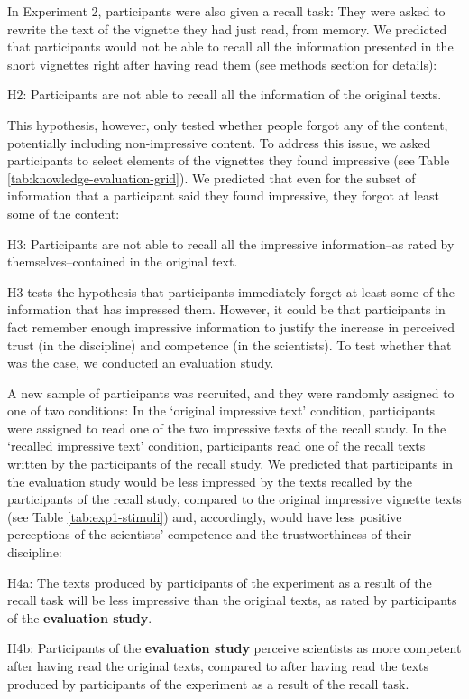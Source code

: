 \documentclass[
  english,
  doc,floatsintext]{apa6}
\begin{document}
In Experiment 2, participants were also given a recall task: They were asked to rewrite the text of the vignette they had just read, from memory. We predicted that participants would not be able to recall all the information presented in the short vignettes right after having read them (see methods section for details):

H2: Participants are not able to recall all the information of the original texts.

This hypothesis, however, only tested whether people forgot any of the content, potentially including non-impressive content. To address this issue, we asked participants to select elements of the vignettes they found impressive (see Table \ref{tab:knowledge-evaluation-grid}). We predicted that even for the subset of information that a participant said they found impressive, they forgot at least some of the content:

H3: Participants are not able to recall all the impressive information--as rated by themselves--contained in the original text.

H3 tests the hypothesis that participants immediately forget at least some of the information that has impressed them. However, it could be that participants in fact remember enough impressive information to justify the increase in perceived trust (in the discipline) and competence (in the scientists). To test whether that was the case, we conducted an evaluation study.

A new sample of participants was recruited, and they were randomly assigned to one of two conditions: In the `original impressive text' condition, participants were assigned to read one of the two impressive texts of the recall study. In the `recalled impressive text' condition, participants read one of the recall texts written by the participants of the recall study. We predicted that participants in the evaluation study would be less impressed by the texts recalled by the participants of the recall study, compared to the original impressive vignette texts (see Table \ref{tab:exp1-stimuli}) and, accordingly, would have less positive perceptions of the scientists' competence and the trustworthiness of their discipline:

H4a: The texts produced by participants of the experiment as a result of the recall task will be less impressive than the original texts, as rated by participants of the \textbf{evaluation study}.

H4b: Participants of the \textbf{evaluation study} perceive scientists as more competent after having read the original texts, compared to after having read the texts produced by participants of the experiment as a result of the recall task.
\end{document}
